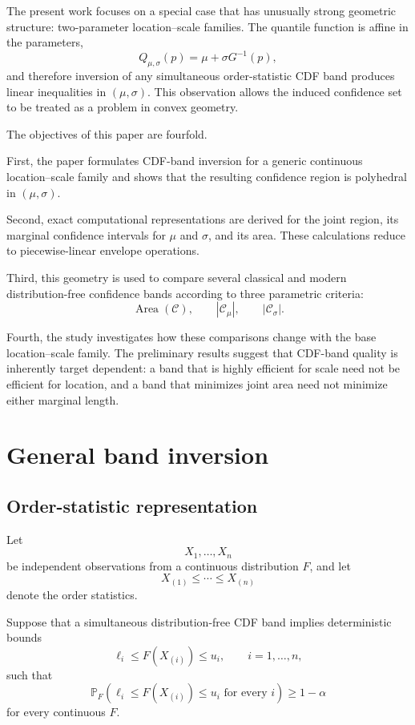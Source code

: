 \documentclass[11pt]{article}
\newcommand{\Pp}{\mathbb{P}}
\newcommand{\cC}{\mathcal{C}}
\begin{document}
The present work focuses on a special case that has unusually strong
geometric structure: two-parameter location--scale families.  The
quantile function is affine in the parameters,
\[
    Q_{\mu,\sigma}(p)
    =
    \mu+\sigma G^{-1}(p),
\]
and therefore inversion of any simultaneous order-statistic CDF band
produces linear inequalities in $(\mu,\sigma)$.  This observation allows
the induced confidence set to be treated as a problem in convex
geometry.

The objectives of this paper are fourfold.

First, the paper formulates CDF-band inversion for a generic continuous
location--scale family and shows that the resulting confidence region is
polyhedral in $(\mu,\sigma)$.

Second, exact computational representations are derived for the joint
region, its marginal confidence intervals for $\mu$ and $\sigma$, and
its area.  These calculations reduce to piecewise-linear envelope
operations.

Third, this geometry is used to compare several classical and modern
distribution-free confidence bands according to three parametric
criteria:
\[
    \operatorname{Area}(\cC),\qquad
    |\cC_\mu|,\qquad
    |\cC_\sigma|.
\]

Fourth, the study investigates how these comparisons change with the base
location--scale family.  The preliminary results suggest that
CDF-band quality is inherently target dependent: a band that is highly
efficient for scale need not be efficient for location, and a band that
minimizes joint area need not minimize either marginal length.


\section{General band inversion}

\subsection{Order-statistic representation}

Let
\[
    X_1,\ldots,X_n
\]
be independent observations from a continuous distribution $F$, and let
\[
    X_{(1)}\leq\cdots\leq X_{(n)}
\]
denote the order statistics.

Suppose that a simultaneous distribution-free CDF band implies
deterministic bounds
\begin{equation}
    \ell_i
    \leq
    F(X_{(i)})
    \leq
    u_i,
    \qquad i=1,\ldots,n,
    \label{eq:orderband}
\end{equation}
such that
\begin{equation}
    \Pp_F
    \left(
        \ell_i
        \leq
        F(X_{(i)})
        \leq
        u_i
        \text{ for every }i
    \right)
    \geq
    1-\alpha
    \label{eq:coverage}
\end{equation}
for every continuous $F$.
\end{document}
